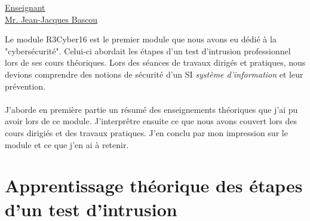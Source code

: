 \renewcommand{\figurename}{}

\vspace*{0.2cm}%
      \large
      \href{\@orientadorPagina}{\color{black}Enseignant\\Mr. Jean-Jacques Bascou}\\%
\vspace*{0.5cm}%

Le module R3Cyber16 est le premier module que nous avons eu dédié à la "cybersécurité". Celui-ci abordait les étapes d'un test d'intrusion professionnel lors de ses cours théoriques. Lors des séances de travaux dirigés et pratiques, nous devions comprendre des notions de sécurité d'un SI \textit{système d'information} et leur prévention.
\\ \\
J'aborde en première partie un résumé des enseignements théoriques que j'ai pu avoir lors de ce module. J'interprêtre ensuite ce que nous avons couvert lors des cours dirigiés et des travaux pratiques. J'en conclu par mon impression sur le module et ce que j'en ai à retenir.

\section{Apprentissage théorique des étapes d'un test d'intrusion}

